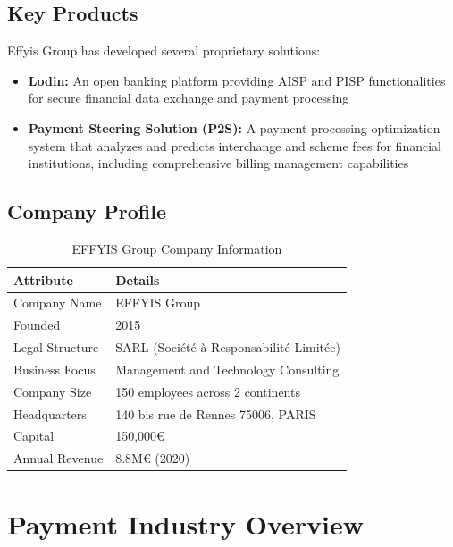 \subsection{Key Products}

Effyis Group has developed several proprietary solutions:

\begin{itemize}
    \item \textbf{Lodin:} An open banking platform providing AISP and PISP functionalities for secure financial data exchange and payment processing
    \item \textbf{Payment Steering Solution (P2S):} A payment processing optimization system that analyzes and predicts interchange and scheme fees for financial institutions, including comprehensive billing management capabilities
\end{itemize}

\subsection{Company Profile}

\begin{table}[ht]
    \centering
    \begin{tabular}{|l|l|}
        \hline
        \textbf{Attribute} & \textbf{Details} \\
        \hline
        Company Name & EFFYIS Group \\
        \hline
        Founded & 2015 \\
        \hline
        Legal Structure & SARL (Société à Responsabilité Limitée) \\
        \hline
        Business Focus & Management and Technology Consulting \\
        \hline
        Company Size & 150 employees across 2 continents \\
        \hline
        Headquarters & 140 bis rue de Rennes 75006, PARIS \\
        \hline
        Capital & 150,000€ \\
        \hline
        Annual Revenue & 8.8M€ (2020) \\
        \hline
    \end{tabular}
    \caption{EFFYIS Group Company Information}
\end{table}

\section{Payment Industry Overview}

